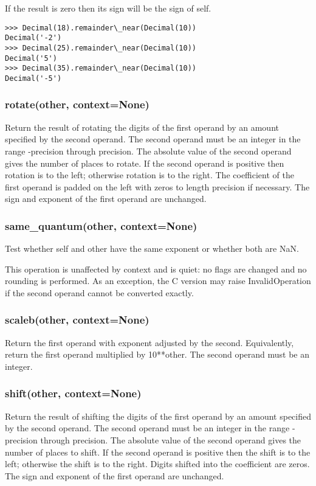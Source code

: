 If the result is zero then its sign will be the sign of self.

\begin{lstlisting}
>>> Decimal(18).remainder\_near(Decimal(10))
Decimal('-2')
>>> Decimal(25).remainder\_near(Decimal(10))
Decimal('5')
>>> Decimal(35).remainder\_near(Decimal(10))
Decimal('-5')
\end{lstlisting}

\subsubsection{rotate(other, context=None)}

Return the result of rotating the digits of the first operand by an amount specified by the second operand. The second operand must be an integer in the range -precision through precision. The absolute value of the second operand gives the number of places to rotate. If the second operand is positive then rotation is to the left; otherwise rotation is to the right. The coefficient of the first operand is padded on the left with zeros to length precision if necessary. The sign and exponent of the first operand are unchanged.

\subsubsection{same\_quantum(other, context=None)}

Test whether self and other have the same exponent or whether both are NaN.

This operation is unaffected by context and is quiet: no flags are changed and no rounding is performed. As an exception, the C version may raise InvalidOperation if the second operand cannot be converted exactly.

\subsubsection{scaleb(other, context=None)}

Return the first operand with exponent adjusted by the second. Equivalently, return the first operand multiplied by 10**other. The second operand must be an integer.

\subsubsection{shift(other, context=None)}

Return the result of shifting the digits of the first operand by an amount specified by the second operand. The second operand must be an integer in the range -precision through precision. The absolute value of the second operand gives the number of places to shift. If the second operand is positive then the shift is to the left; otherwise the shift is to the right. Digits shifted into the coefficient are zeros. The sign and exponent of the first operand are unchanged.


